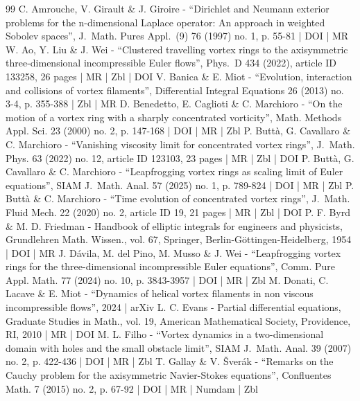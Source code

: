 \documentclass[10pt]{amsart}
\theoremstyle{definition}
\begin{document}
\begin{thebibliography}{99}
C. Amrouche, V. Girault \& J. Giroire - “Dirichlet and Neumann exterior problems for the n-dimensional Laplace operator: An approach in weighted Sobolev spaces”, J. Math. Pures Appl. (9) 76 (1997) no. 1, p. 55-81 | DOI | MR
W. Ao, Y. Liu \& J. Wei - “Clustered travelling vortex rings to the axisymmetric three-dimensional incompressible Euler flows”, Phys. D 434 (2022), article ID 133258, 26 pages | MR | Zbl | DOI
V. Banica \& E. Miot - “Evolution, interaction and collisions of vortex filaments”, Differential Integral Equations 26 (2013) no. 3-4, p. 355-388 | Zbl | MR
D. Benedetto, E. Caglioti \& C. Marchioro - “On the motion of a vortex ring with a sharply concentrated vorticity”, Math. Methods Appl. Sci. 23 (2000) no. 2, p. 147-168 | DOI | MR | Zbl
P. Buttà, G. Cavallaro \& C. Marchioro - “Vanishing viscosity limit for concentrated vortex rings”, J. Math. Phys. 63 (2022) no. 12, article ID 123103, 23 pages | MR | Zbl | DOI
P. Buttà, G. Cavallaro \& C. Marchioro - “Leapfrogging vortex rings as scaling limit of Euler equations”, SIAM J. Math. Anal. 57 (2025) no. 1, p. 789-824 | DOI | MR | Zbl
P. Buttà \& C. Marchioro - “Time evolution of concentrated vortex rings”, J. Math. Fluid Mech. 22 (2020) no. 2, article ID 19, 21 pages | MR | Zbl | DOI
P. F. Byrd \& M. D. Friedman - Handbook of elliptic integrals for engineers and physicists, Grundlehren Math. Wissen., vol. 67, Springer, Berlin-Göttingen-Heidelberg, 1954 | DOI | MR
J. Dávila, M. del Pino, M. Musso \& J. Wei - “Leapfrogging vortex rings for the three-dimensional incompressible Euler equations”, Comm. Pure Appl. Math. 77 (2024) no. 10, p. 3843-3957 | DOI | MR | Zbl
M. Donati, C. Lacave \& E. Miot - “Dynamics of helical vortex filaments in non viscous incompressible flows”, 2024 | arXiv
L. C. Evans - Partial differential equations, Graduate Studies in Math., vol. 19, American Mathematical Society, Providence, RI, 2010 | MR | DOI
M. L. Filho - “Vortex dynamics in a two-dimensional domain with holes and the small obstacle limit”, SIAM J. Math. Anal. 39 (2007) no. 2, p. 422-436 | DOI | MR | Zbl
T. Gallay \& V. Šverák - “Remarks on the Cauchy problem for the axisymmetric Navier-Stokes equations”, Confluentes Math. 7 (2015) no. 2, p. 67-92 | DOI | MR | Numdam | Zbl

\end{thebibliography}
\end{document}
